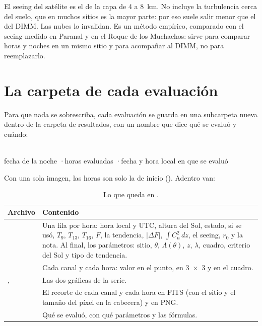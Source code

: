 \begin{cuidado}
El seeing del satélite es el de la capa de 4 a 8~km. No incluye la turbulencia cerca del suelo, que en muchos sitios es
la mayor parte: por eso suele salir menor que el del DIMM. Las nubes lo invalidan. Es un método empírico, comparado con
el seeing medido en Paranal y en el Roque de los Muchachos: sirve para comparar horas y noches en un mismo sitio y para acompañar al DIMM, no para
reemplazarlo.
\end{cuidado}

\section{La carpeta de cada evaluación}\label{sec:carpeta_eval}

Para que nada se sobrescriba, cada evaluación se guarda en una subcarpeta nueva dentro de la carpeta de resultados, con
un nombre que dice qué se evaluó y cuándo:
\begin{center}
\textbf{}\ruta{\_}\textbf{}\ruta{\_}\textbf{}\\[0.3em]
{\small\color{gris}fecha de la noche \quad·\quad horas evaluadas \quad·\quad fecha y hora local en que se evaluó}
\end{center}
Con una sola imagen, las horas son solo la de inicio (). Adentro van:

\begin{table}[H]
\centering\small
\begin{tabularx}{\linewidth}{@{}l Y@{}}
\toprule
Archivo & Contenido\\
\midrule
{} & Una fila por hora: hora local y UTC, altura del Sol, estado, si se usó, $T_9$, $T_{13}$, $T_{16}$,
$F$, la tendencia, $|\Delta F|$, $\int C_n^2\,dz$, el seeing, $r_0$ y la nota. Al final, los parámetros: sitio, $\theta$,
$\Lambda(\theta)$, $z$, $\lambda$, cuadro, criterio del Sol y tipo de tendencia.\\
 & Cada canal y cada hora: valor en el punto, en 3~×~3 y en el cuadro.\\
,  & Las dos gráficas de la serie.\\
 & El recorte de cada canal y cada hora en FITS (con el sitio y el tamaño del píxel en la cabecera) y en PNG.\\
 & Qué se evaluó, con qué parámetros y las fórmulas.\\
\bottomrule
\end{tabularx}
\caption{Lo que queda en .}
\end{table}

